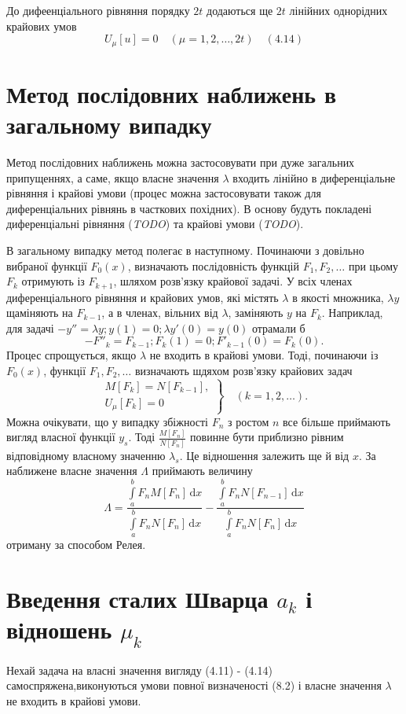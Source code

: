 \documentclass[12pt,a4paper]{article}
\begin{document}
До дифеенціального рівняння порядку $2t$ додаються ще $2t$ лінійних однорідних крайових умов
\[
U_\mu [u] = 0 \quad (\mu = 1, 2, \dots, 2t)   \quad (4.14)
\]

\clearpage

\section{Метод послідовних наближень в загальному випадку}Метод послідовних наближень можна застосовувати при дуже загальних припущеннях, а саме, якщо власне значення $\lambda$ входить лінійно в диференціальне рівняння і крайові умови (процес можна застосовувати також для диференціальних рівнянь в часткових похідних). В основу будуть покладені диференціальні рівняння (\emph{TODO}) та крайові умови (\emph{TODO}).

В загальному випадку метод полегає в наступному. Починаючи з довільно вибраної функції $F_0(x)$, визначають послідовність функцій $F_1, F_2, \dots$ при цьому $F_k$ отримують із $F_{k+1}$, шляхом розв'язку крайової задачі. У всіх членах диференціального рівняння и крайових умов, які містять $\lambda$ в якості множника, $\lambda y$ щаміняють на $F_{k-1}$, а в членах, вільних від $\lambda$, заміняють $y$ на $F_k$. Наприклад, для задачі $- y'' = \lambda y; y(1) = 0; \lambda y'(0) = y(0)$ отрамали б
\[
	- F''_k = F_{k-1}; F_k(1) = 0; F'_{k-1}(0) = F_k(0).
\] 
Процес спрощується, якщо $\lambda$ не входить в крайові умови. Тоді, починаючи із $F_0(x)$, функції $F_1, F_2, \dots$ визначають шдяхом розв'язку крайових задач
\[
\left.
\begin{array}{l}
	M[F_k] = N[F_{k-1}],\\
	U_\mu[F_k] = 0
\end{array} \right\}
\quad
(k = 1, 2, \dots).
\]
Можна очікувати, що у випадку збіжності $F_n$ з ростом $n$ все більше приймають вигляд власної функції $y_s$. Тоді $\frac{M[F_n]}{N[F_n]}$ повинне бути приблизно рівним відповідному власному значенню $\lambda_s$. Це відношення залежить ще й від $x$. За наближене власне значення $\Lambda$ приймають величину
\[
\Lambda = \frac{\int\limits_a^b F_n M[F_n]\,\mathrm{d}x}
			   {\int\limits_a^b F_n N[F_n]\,\mathrm{d}x}
		  -
		  \frac{\int\limits_a^b F_n N[F_{n-1}]\,\mathrm{d}x}
			   {\int\limits_a^b F_n N[F_n]\,\mathrm{d}x}
\]
отриману за способом Релея.

\section{Введення сталих Шварца $a_k$ і відношень $\mu_k$}
Нехай задача на власні значення вигляду (4.11) - (4.14) самоспряжена,виконуються умови повної визначеності (8.2) і власне значення $\lambda$ не входить в крайові умови.
\end{document}
